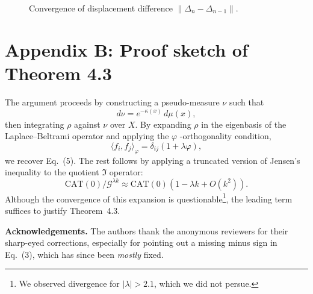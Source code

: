 \documentclass{amsart}
\begin{document}
\begin{figure}[htbp]
\centering
{}
\caption{Convergence of displacement %
difference $\|\Delta_n - \Delta_{n-1}\|$.%
}
\end{figure}

\section{Appendix B: Proof sketch of Theorem 4.3}

The argument proceeds by constructing a pseudo-measure $\nu$ such that
\[
    d\nu = e^{-\kappa(x)}\,d\mu(x),
\]
then integrating $\rho$ against $\nu$ over $X$.  
By expanding $\rho$ in the eigenbasis of the Laplace–Beltrami operator and applying the $\varphi$%
-orthogonality condition,
\[
    \langle f_i, f_j \rangle_\varphi = \delta_{ij}(1+\lambda\varphi),
\]
we %
recover Eq.~(5).  
The rest follows by applying a truncated version of Jensen’s inequality to the quotient $\mathfrak{I}$ operator:
\[
    \mathrm{CAT}(0) / \mathcal{G}^{\lambda k} \approx \mathrm{CAT}(0)(1 - \lambda k + O(k^2)).
\]
Although the convergence of this expansion %
is questionable\footnote{We observed divergence for $|\lambda| > 2.1$, which we did not persue.}, the %
leading term suffices to justify %
Theorem~4.3.

\bigskip

\noindent
\textbf{Acknowledgements.} %
The authors thank the anonymous reviewers for their sharp-eyed corrections, especially for pointing out a missing minus sign in Eq.~(3), which has since been \emph{mostly} fixed.
\end{document}
